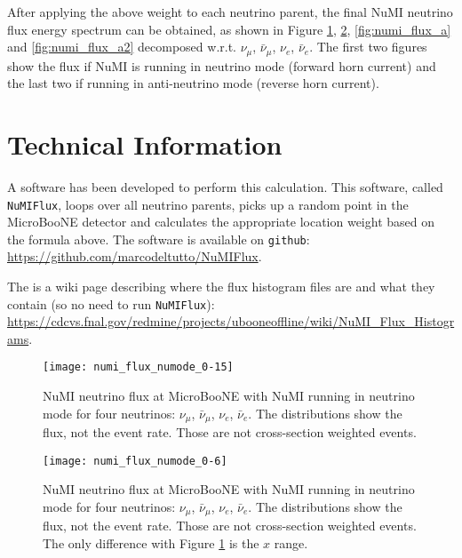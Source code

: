 \documentclass[a4paper, oneside, 12pt]{article}
\newcommand{\uB}{MicroBooNE\xspace}
\begin{document}
After applying the above weight to each neutrino parent, the final NuMI neutrino flux energy spectrum can be obtained, as shown in Figure \ref{fig:numi_flux},  \ref{fig:numi_flux2}, \ref{fig:numi_flux_a} and \ref{fig:numi_flux_a2} decomposed w.r.t. $\nu_\mu$, $\bar{\nu}_\mu$, $\nu_e$, $\bar{\nu}_e$. The first two figures show the flux if NuMI is running in neutrino mode (forward horn current) and the last two if running in anti-neutrino mode (reverse horn current).

\section{Technical Information}

A software has been developed to perform this calculation. This software, called \texttt{NuMIFlux}, loops over all neutrino parents, picks up a random point in the \uB detector and calculates the appropriate location weight based on the formula above. The software is available on \texttt{github}: \url{https://github.com/marcodeltutto/NuMIFlux}.

The is a wiki page describing where the flux histogram files are and what they contain (so no need to run \texttt{NuMIFlux}): \url{https://cdcvs.fnal.gov/redmine/projects/ubooneoffline/wiki/NuMI_Flux_Histograms}.




\renewcommand*{\bibfont}{\footnotesize}
\nocite{*}
\printbibliography

\clearpage

\begin{figure}[]
\centering
\texttt{[image: numi\_flux\_numode\_0-15]}
\caption{NuMI neutrino flux at \uB with NuMI running in neutrino mode for four neutrinos: $\nu_\mu$, $\bar{\nu}_\mu$, $\nu_e$, $\bar{\nu}_e$. The distributions show the flux, not the event rate. Those are not cross-section weighted events.}
\label{fig:numi_flux}
\end{figure}

\begin{figure}[]
\centering
\texttt{[image: numi\_flux\_numode\_0-6]}
\caption{NuMI neutrino flux at \uB with NuMI running in neutrino mode for four neutrinos: $\nu_\mu$, $\bar{\nu}_\mu$, $\nu_e$, $\bar{\nu}_e$. The distributions show the flux, not the event rate. Those are not cross-section weighted events. The only difference with Figure \ref{fig:numi_flux} is the $x$ range.}
\label{fig:numi_flux2}
\end{figure}
\end{document}
